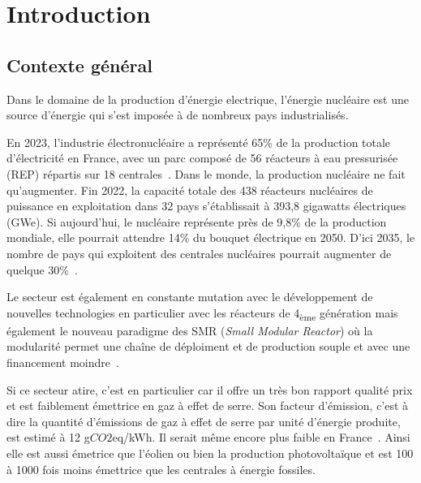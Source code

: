 
\chapter{Introduction}

\section{Contexte général}

Dans le domaine de la production d'énergie electrique, l'énergie nucléaire est une source d'énergie qui s'est imposée à de nombreux pays industrialisés.

En 2023, l'industrie électronucléaire a représenté 65\% de la production totale d'électricité en France, avec un parc composé de 56 réacteurs à eau pressurisée (REP) répartis sur 18 centrales~\cite{rte2023}. Dans le monde, la production nucléaire ne fait qu'augmenter. Fin 2022, la capacité totale des 438 réacteurs nucléaires de puissance en exploitation dans 32 pays s’établissait à 393,8 gigawatts électriques (GWe). Si aujourd'hui, le nucléaire représente près de 9,8\% de la production mondiale, elle pourrait attendre 14\% du bouquet électrique en 2050. D'ici 2035, le nombre de pays qui exploitent des centrales nucléaires pourrait augmenter de quelque 30\%~\cite{aiea2023}.

Le secteur est également en constante mutation avec le développement de nouvelles technologies en particulier avec les réacteurs de 4\textsubscript{ème} génération mais également le nouveau paradigme des SMR (\textit{Small Modular Reactor}) où la modularité permet une chaîne de déploiment et de production souple et avec une financement moindre~\cite{academie2022}.

Si ce secteur atire, c'est en particulier car il offre un très bon rapport qualité prix et est faiblement émettrice en gaz à effet de serre. Son facteur d'émission, c'est à dire la quantité d'émissions de gaz à effet de serre par unité d'énergie produite, est estimé à 12 g$CO2$eq/kWh. Il serait même encore plus faible en France~\cite{schlomer_technology-specific_nodate}. Ainsi elle est aussi émetrice que l'éolien ou bien la production photovoltaïque et est 100 à 1000 fois moins émettrice que les centrales à énergie fossiles.

